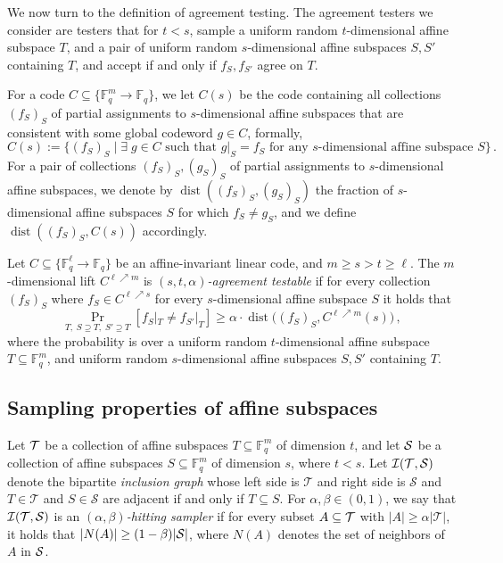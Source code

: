 \documentclass{toc}
\theoremstyle{plain}
\DeclareMathOperator{\dist}{dist} %
\newcommand{\F}{{\mathbb{F}}}
\newcommand{\calT}{{\mathcal{T}}}
\newcommand{\calS}{{\mathcal{S}}}
\newcommand{\calI}{{\mathcal{I}}}
\newcommand{\Func}[1]{\{\F_q^{#1} \to \F_q\}}
\begin{document}
We now turn to the definition of agreement testing. The agreement testers we consider are testers that for $t<s$, sample a uniform random $t$-dimensional affine subspace $T$, and a pair of uniform random $s$-dimensional affine subspaces $S,S'$ containing $T$, and accept if and only if $f_S, f_{S'}$ agree on $T$.

For a code $C \subseteq \{\F_q^m \to \F_q\}$, we let $C(s)$ be the code containing all collections $(f_S)_S$ of partial assignments to $s$-dimensional affine subspaces  that are consistent with some global codeword $g \in C$, formally,
\[ C(s):=\big\{ (f_S)_S \mid \text{$\exists \; g \in C$ such that  $g|_S = f_S$ for any $s$-dimensional affine subspace $S$}  \big\}\,. \]
For a pair of collections $(f_S)_S, (g_S)_S$ of partial assignments to $s$-dimensional affine subspaces,  we denote by $\dist((f_S)_S, (g_S)_S)$ the fraction of $s$-dimensional affine subspaces $S$ for which $f_S \neq g_S$, and we define $\dist((f_S)_S, C(s))$ accordingly.

\begin{definition}
Let $C \subseteq \Func{\ell}$ be an affine-invariant linear  code, and $m \geq s > t \geq \ell$. The $m$-dimensional lift $C^{\ell \nearrow m}$ is \emph{$(s,t,\alpha)$-agreement testable} if for every collection $(f_S)_S$ where $f_S \in C^{\ell \nearrow s}$ for every $s$-dimensional affine subspace $S$  it holds that
\[\Pr_{T,\; S \supseteq T, \;S' \supseteq T}[f_S|_T \neq f_{S'}|_T] \geq \alpha \cdot \dist\big((f_S)_S, C^{\ell \nearrow m}(s)\big)\,,\]
where the probability is over a uniform random $t$-dimensional affine subspace $T \subseteq \F_q^m$, and uniform random $s$-dimensional affine subspaces $S,S'$ containing $T$.
\end{definition}

\subsection{Sampling properties of affine subspaces}

%

Let $\cal T$ be a collection of affine subspaces $T \subseteq \F_q^m$ of dimension $t$, and let $\cal S$ be a collection of affine subspaces
$S \subseteq \F_q^m$ of dimension $s$, %
where %
$t<s$. Let $\calI (\cal T, \cal S)$ denote the bipartite \emph{inclusion graph}
whose left side %
is $\calT$ and  %
%
right side is $\calS$  %
and
%
%
$T\in\calT$ and $S\in\calS$ are adjacent   %
if and only if $T \subseteq S$. 
For $\alpha, \beta \in (0,1)$, we say that $\calI (\cal T, \cal S)$ is 
 an \emph{$(\alpha, \beta)$-hitting sampler} if for every subset $A \subseteq \cal T$ with $|A| \geq \alpha |\calT|$, it holds that
 $|N(A)| \geq (1-\beta)  |\cal S|$, where $N(A)$ denotes the set of neighbors of $A$ in $\cal S$. 
 
\end{document}
